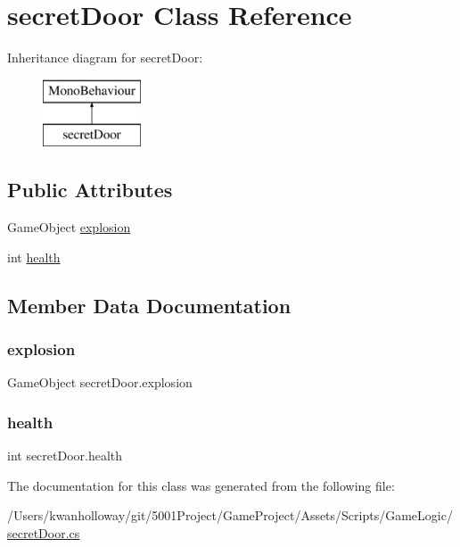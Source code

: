 \hypertarget{classsecret_door}{}\section{secret\+Door Class Reference}
\label{classsecret_door}
Inheritance diagram for secret\+Door\+:\begin{figure}[H]
\begin{center}
\leavevmode
\includegraphics[height=2.000000cm]{classsecret_door}
\end{center}
\end{figure}
\subsection*{Public Attributes}
\begin{DoxyCompactItemize}
\item 
Game\+Object \hyperlink{classsecret_door_ab67c561323146700b864bd14eed390ff}{explosion}
\item 
int \hyperlink{classsecret_door_a77a1b508f134b56202da2638bff65c8f}{health}
\end{DoxyCompactItemize}


\subsection{Member Data Documentation}
\mbox{\label{classsecret_door_ab67c561323146700b864bd14eed390ff}} 
\subsubsection{\texorpdfstring{explosion}{explosion}}
{\footnotesize\ttfamily Game\+Object secret\+Door.\+explosion}

\mbox{\label{classsecret_door_a77a1b508f134b56202da2638bff65c8f}} 
\subsubsection{\texorpdfstring{health}{health}}
{\footnotesize\ttfamily int secret\+Door.\+health}



The documentation for this class was generated from the following file\+:\begin{DoxyCompactItemize}
\item 
/\+Users/kwanholloway/git/5001\+Project/\+Game\+Project/\+Assets/\+Scripts/\+Game\+Logic/\hyperlink{secret_door_8cs}{secret\+Door.\+cs}\end{DoxyCompactItemize}
